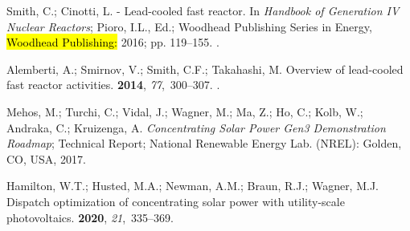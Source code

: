 \documentclass[sustainability,article,accept,moreauthors,pdftex]{Definitions/mdpi}
\begin{document}
\begin{thebibliography}{999}
Smith, C.; Cinotti, L.
 - Lead-cooled fast reactor. In {\em Handbook of Generation IV
  Nuclear Reactors}; Pioro, I.L., Ed.; Woodhead Publishing Series in Energy,
  \hl{Woodhead Publishing:} %
 2016; pp. 119--155.
\newblock
  {\href{https://doi.org/https://doi.org/10.1016/B978-0-08-100149-3.00006-9}{}}.

Alemberti, A.; Smirnov, V.; Smith, C.F.; Takahashi, M.
\newblock Overview of lead-cooled fast reactor activities.
 {\bf 2014}, {\em 77},~300--307.
\newblock
  {\href{https://doi.org/https://doi.org/10.1016/j.pnucene.2013.11.011}{}}.

Mehos, M.; Turchi, C.; Vidal, J.; Wagner, M.; Ma, Z.; Ho, C.; Kolb, W.;
  Andraka, C.; Kruizenga, A.
\newblock \emph{Concentrating Solar Power Gen3 Demonstration Roadmap};
\newblock Technical Report; National Renewable Energy Lab. (NREL): Golden, CO,
 USA,  2017.

Hamilton, W.T.; Husted, M.A.; Newman, A.M.; Braun, R.J.; Wagner, M.J.
\newblock Dispatch optimization of concentrating solar power with utility-scale
  photovoltaics.
 {\bf 2020}, {\em 21},~335--369.

\end{thebibliography}
\end{document}
